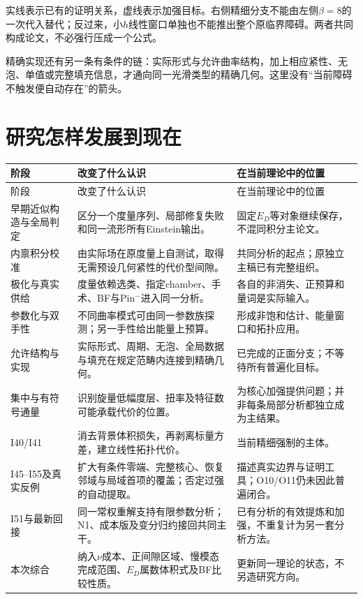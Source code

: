 \documentclass[UTF8,fontset=fandol,zihao=-4,a4paper]{ctexart}
\theoremstyle{remark}
\begin{document}
实线表示已有的证明关系，虚线表示加强目标。右侧精细分支不能由左侧$\beta=8$的一次代入替代；反过来，小$h$线性窗口单独也不能推出整个原临界障碍。两者共同构成论文，不必强行压成一个公式。

精确实现还有另一条有条件的链：实际形式与允许曲率结构，加上相应紧性、无泡、单值或完整填充信息，才通向同一光滑类型的精确几何。这里没有“当前障碍不触发便自动存在”的箭头。

\section{研究怎样发展到现在}

\begin{longtable}{L{28mm}L{65mm}L{54mm}}
\toprule 阶段 & 改变了什么认识 & 在当前理论中的位置 \\\midrule
\endfirsthead
\toprule 阶段 & 改变了什么认识 & 在当前理论中的位置 \\\midrule
\endhead
早期近似构造与全局判定 & 区分一个度量序列、局部修复失败和同一流形所有Einstein输出。 & 固定$E_D$等对象继续保存，不混同积分主论文。 \\
内禀积分校准 & 由实际场在原度量上自测试，取得无需预设几何紧性的代价型间隙。 & 共同分析的起点；原独立主稿已有完整组织。 \\
极化与真实供给 & 度量依赖选类、指定chamber、手术、BF与Pin$^-$进入同一分析。 & 各自的非消失、正预算和量词是实际输入。 \\
参数化与双手性 & 不同曲率模式可由同一参数族探测；另一手性给出能量上预算。 & 形成非饱和估计、能量窗口和拓扑应用。 \\
允许结构与实现 & 实际形式、周期、无泡、全局数据与填充在规定范畴内连接到精确几何。 & 已完成的正面分支；不等待所有普遍化目标。 \\
集中与有符号通量 & 识别旋量低幅度层、扭率及特征数可能承载代价的位置。 & 为核心加强提供问题；并非每条局部分析都独立成为主结果。 \\
I40/I41 & 消去背景体积损失，再剥离标量方差，建立线性拓扑代价。 & 当前精细强制的主体。 \\
I45--I55及真实反例 & 扩大有条件零端、完整核心、恢复邻域与局域首项的覆盖；否定过强的自动提取。 & 描述真实边界与证明工具；O10/O11仍未因此普遍闭合。 \\
I51与最新回接 & 同一常权重解支持有限参数分析；N1、成本版及变分归约接回共同主干。 & 已有分析的有效提炼和加强，不重复计为另一套分析方法。 \\
本次综合 & 纳入$\nu$成本、正间隙区域、慢模态完成范围、$E_D$属数体积式及BF比较性质。 & 更新同一理论的状态，不另造研究方向。 \\
\bottomrule
\end{longtable}
\end{document}
